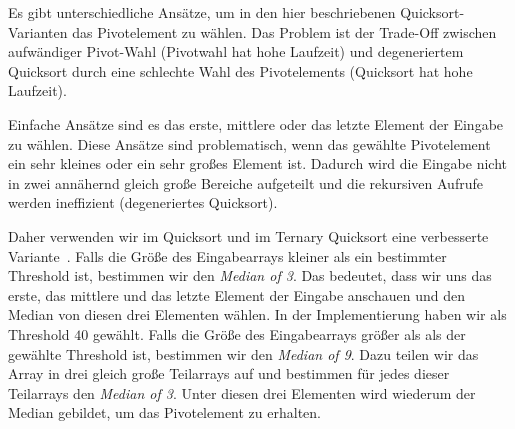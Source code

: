 Es gibt unterschiedliche Ansätze, um in den hier beschriebenen Quicksort-Varian\-ten das Pivotelement zu wählen.
Das Problem ist der Trade-Off zwischen aufwändiger Pivot-Wahl (Pivotwahl hat hohe Laufzeit) und
degeneriertem Quicksort durch eine schlechte Wahl des Pivotelements (Quicksort hat hohe Laufzeit).

Einfache Ansätze sind es das erste, mittlere oder das letzte Element der Eingabe zu wählen.
Diese Ansätze sind problematisch, wenn das gewählte Pivotelement ein sehr kleines oder ein sehr großes Element ist.
Dadurch wird die Eingabe nicht in zwei annähernd gleich große Bereiche aufgeteilt und die rekursiven Aufrufe werden ineffizient (degeneriertes Quicksort).

Daher verwenden wir im Quicksort und im Ternary Quicksort eine verbesserte Variante~\cite{ternary_quicksort}.
Falls die Größe des Eingabearrays kleiner als ein bestimmter Threshold ist,
bestimmen wir den \emph{Median of 3}. Das bedeutet, dass wir uns das erste,
das mittlere und das letzte Element der Eingabe anschauen und den Median von diesen drei Elementen wählen.
In der Implementierung haben wir als Threshold $40$ gewählt.
Falls die Größe des Eingabearrays größer als als der gewählte Threshold ist,
bestimmen wir den \emph{Median of 9}. Dazu teilen wir das Array in drei gleich große Teilarrays auf
und bestimmen für jedes dieser Teilarrays den \emph{Median of 3}.
Unter diesen drei Elementen wird wiederum der Median gebildet, um das Pivotelement zu erhalten.
